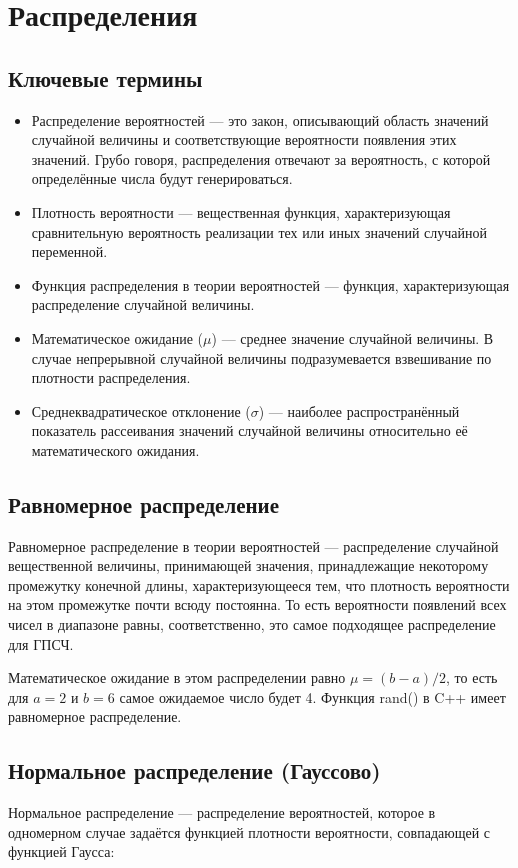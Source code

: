 \documentclass[bachelor, och, referat, times]{SCWorks}
\begin{document}
\section{Распределения}
\subsection{Ключевые термины}
\begin{itemize}
\item
Распределение вероятностей --- это закон, описывающий область значений случайной величины и соответствующие вероятности появления этих значений. Грубо говоря, распределения отвечают за вероятность, с которой определённые числа будут генерироваться.
\item
Плотность вероятности --- вещественная функция, характеризующая сравнительную вероятность реализации тех или иных значений случайной переменной. 
\item
Функция распределения в теории вероятностей --- функция, характеризующая распределение случайной величины.
\item
Математическое ожидание ($\mu$) --- среднее значение случайной величины. В случае непрерывной случайной величины подразумевается взвешивание по плотности распределения. \cite{Gnedenko2019}
\item
Среднеквадратическое отклонение ($\sigma$) --- наиболее распространённый показатель рассеивания значений случайной величины относительно её математического ожидания.
\end{itemize}
\subsection{Равномерное распределение}
Равномерное распределение в теории вероятностей --- распределение случайной вещественной величины, принимающей значения, принадлежащие некоторому промежутку конечной длины, характеризующееся тем, что плотность вероятности на этом промежутке почти всюду постоянна. То есть вероятности появлений всех чисел в диапазоне равны, соответственно, это самое подходящее распределение для ГПСЧ.

Математическое ожидание в этом распределении равно $\mu = (b-a) / 2$, то есть для $a = 2$ и $b = 6$ самое ожидаемое число будет 4. Функция rand() в C++ имеет равномерное распределение.

\subsection{Нормальное распределение (Гауссово)}
Нормальное распределение --- распределение вероятностей, которое в одномерном случае задаётся функцией плотности вероятности, совпадающей с функцией Гаусса:
\end{document}

